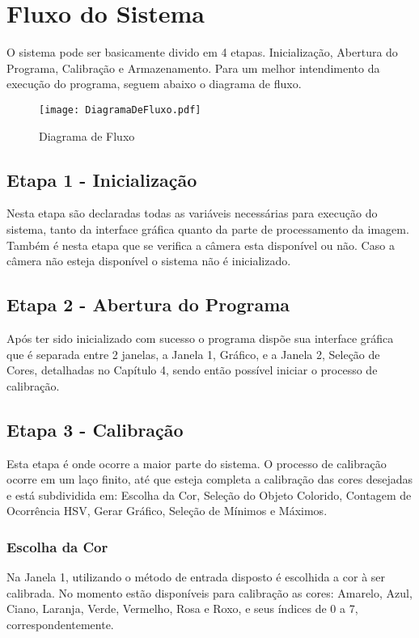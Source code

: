 	\section{Fluxo do Sistema}
	O sistema pode ser basicamente divido em 4 etapas. Inicialização, Abertura do Programa, Calibração e Armazenamento. Para um melhor intendimento da execução do programa, seguem abaixo o diagrama de fluxo. 
		\begin{figure}[!h]
			\centering
			\texttt{[image: DiagramaDeFluxo.pdf]}
			\caption{Diagrama de Fluxo}
			\label{FlowCHart}
		\end{figure}
		
	\subsection{Etapa 1 - Inicialização}	
	Nesta etapa são declaradas todas as variáveis necessárias para execução do sistema, tanto da interface gráfica quanto da parte de processamento da imagem. Também é nesta etapa que se verifica a câmera esta disponível ou não. Caso a câmera não esteja disponível o sistema não é inicializado.
	
	
	\subsection{Etapa 2 - Abertura do Programa}		
		Após ter sido inicializado com sucesso o programa dispõe sua interface gráfica que é separada entre 2 janelas, a Janela 1, Gráfico, e a Janela 2, Seleção de Cores, detalhadas no Capítulo 4, sendo então possível iniciar o processo de calibração. 

\subsection{Etapa 3 - Calibração}		
			Esta etapa é onde ocorre a maior parte do sistema. O processo de calibração ocorre em um laço finito, até que esteja completa a calibração das cores desejadas e está subdividida em: Escolha da Cor, Seleção do Objeto Colorido, Contagem de Ocorrência HSV, Gerar Gráfico, Seleção de Mínimos e Máximos.
			
\subsubsection{Escolha da Cor}
			 Na Janela 1, utilizando o método de entrada disposto é escolhida a cor à ser calibrada. No momento estão disponíveis para calibração as cores: Amarelo, Azul, Ciano, Laranja, Verde, Vermelho, Rosa e Roxo, e seus índices de 0 a 7, correspondentemente. 
